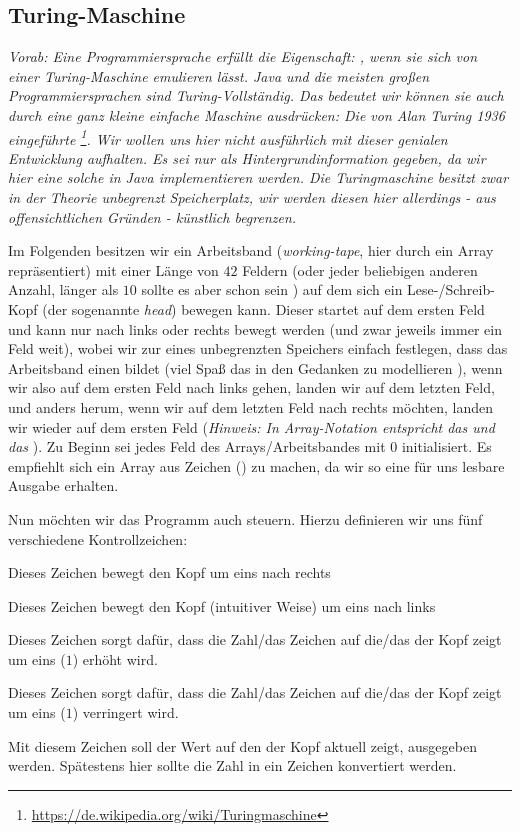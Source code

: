 \documentclass[table]{sopra-base}
\let\T\texttt
\begin{document}
\subsection{Turing-Maschine}
\label{sec:turing}
\textit{Vorab: Eine Programmiersprache erfüllt die Eigenschaft: , wenn sie sich von einer Turing-Maschine emulieren lässt. Java und die meisten großen Programmiersprachen sind Turing-Vollständig. Das bedeutet wir können sie auch durch eine ganz kleine einfache Maschine ausdrücken: Die von Alan Turing 1936 eingeführte \footnote{\url{https://de.wikipedia.org/wiki/Turingmaschine}}. Wir wollen uns hier nicht ausführlich mit dieser genialen Entwicklung aufhalten. Es sei nur als Hintergrundinformation gegeben, da wir hier eine solche in Java implementieren werden. Die Turingmaschine besitzt zwar in der Theorie unbegrenzt Speicherplatz, wir werden diesen hier allerdings - aus offensichtlichen Gründen - künstlich begrenzen.}\par{}

Im Folgenden besitzen wir ein Arbeitsband (\emph{working-tape}, hier durch ein Array repräsentiert) mit einer Länge von $42$ Feldern (oder jeder beliebigen anderen Anzahl, länger als $10$ sollte es aber schon sein \Tongey) auf dem sich ein Lese-/Schreib-Kopf (der sogenannte \emph{head}) bewegen kann. Dieser startet auf dem ersten Feld und kann nur nach links oder rechts bewegt werden (und zwar jeweils immer ein Feld weit), wobei wir zur
 eines unbegrenzten Speichers einfach festlegen, dass das Arbeitsband einen  bildet (viel Spaß das in den Gedanken zu modellieren \Laughey), wenn wir also auf dem ersten Feld nach links gehen, landen wir auf dem letzten Feld, und anders herum, wenn wir auf dem letzten Feld nach rechts möchten, landen wir wieder auf dem ersten Feld (\textit{Hinweis: In Array-Notation entspricht das   und das  }). 
Zu Beginn sei jedes Feld des Arrays/Arbeitsbandes mit $0$ initialisiert. Es empfiehlt sich ein Array aus Zeichen () zu machen, da wir so eine für uns lesbare Ausgabe erhalten.\par{}
Nun möchten wir das Programm auch steuern. Hierzu definieren wir uns fünf verschiedene Kontrollzeichen:
\begin{description}[nolistsep]
    \item[\say{\T{>}}] Dieses Zeichen bewegt den Kopf um eins nach rechts 
    \item[\say{\T{<}}] Dieses Zeichen bewegt den Kopf (intuitiver Weise) um eins nach links
    \item[\say{\T{+}}] Dieses Zeichen sorgt dafür, dass die Zahl/das Zeichen auf die/das der Kopf zeigt um eins ($1$) erhöht wird.
    \item[\say{\T{-}}] Dieses Zeichen sorgt dafür, dass die Zahl/das Zeichen auf die/das der Kopf zeigt um eins ($1$) verringert wird.
    \item[\say{\T{!}}] Mit diesem Zeichen soll der Wert auf den der Kopf aktuell zeigt, ausgegeben werden. Spätestens hier sollte die Zahl in ein Zeichen konvertiert werden.
\end{description}
\end{document}
